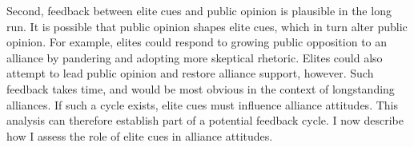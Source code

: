 \documentclass[12pt]{article}
\begin{document}
%
%
%
%
%



Second, feedback between elite cues and public opinion is plausible in the long run. 
It is possible that public opinion shapes elite cues, which in turn alter public opinion. 
For example, elites could respond to growing public opposition to an alliance by pandering and adopting more skeptical rhetoric. 
Elites could also attempt to lead public opinion and restore alliance support, however.
Such feedback takes time, and would be most obvious in the context of longstanding alliances.
If such a cycle exists, elite cues must influence alliance attitudes.
This analysis can therefore establish part of a potential feedback cycle. 
I now describe how I assess the role of elite cues in alliance attitudes. 
\end{document}

